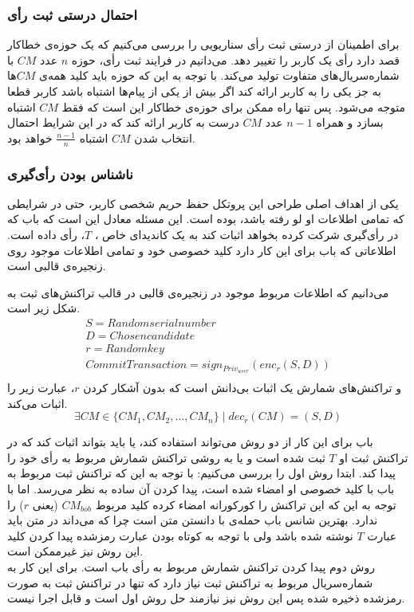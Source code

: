 \subsubsection{احتمال درستی ثبت رأی}
برای اطمینان از درستی ثبت رأی سناریویی را بررسی می‌کنیم که یک حوزه‌ی خطاکار قصد دارد رأی یک کاربر را تغییر دهد. می‌دانیم در فرایند ثبت رأی، حوزه $n$ عدد $CM$ با شماره‌سریال‌های متفاوت تولید می‌کند. با توجه‌ به این که حوزه باید کلید همه‌ی $CM$ها به جز یکی را به کاربر ارائه کند اگر بیش از یکی از پیام‌ها اشتباه باشد کاربر قطعا متوجه می‌شود. پس تنها راه ممکن برای حوزه‌ی خطاکار این است که فقط $CM$ اشتباه بسازد و همراه $n-1$ عدد $CM$ درست به کاربر ارائه کند که در این شرایط احتمال انتخاب شدن $CM$ اشتباه $\frac{n-1}{n}$ خواهد بود. 
\subsubsection{ناشناس بودن رأی‌گیری}
یکی از اهداف اصلی طراحی این پروتکل حفظ حریم شخصی کاربر، حتی در شرایطی که تمامی اطلاعات او لو رفته باشد، بوده است. این مسئله معادل این است که باب که در رأی‌گیری شرکت کرده بخواهد اثبات کند به یک کاندیدای خاص ، $T$، رأی داده است. اطلاعاتی که باب برای این کار دارد کلید خصوصی خود و تمامی اطلاعات موجود روی زنجیره‌ی قالبی است. 
\par 
می‌دانیم که اطلاعات مربوط موجود در زنجیره‌ی قالبی در قالب تراکنش‌های ثبت به شکل زیر است.
	\begin{equation}
	\begin{matrix}


S = Random serial number\\
D = Chosen candidate\\
r = Random key\\
CommitTransaction = sign_{Priv_{user}} (enc_r(S,D)) \\

	\end{matrix}
\label{eq:commit}
\end{equation}
 و تراکنش‌های شمارش یک اثبات بی‌دانش است که بدون آشکار کردن $r$، عبارت زیر را اثبات می‌کند.
	\begin{equation}
\exists CM \in \{CM_1, CM_2, ..., CM_n\}  \mid dec_r(CM) = (S,D)
\label{eq:a}
\end{equation}


\par 
باب برای این کار از دو روش می‌تواند استفاده کند، یا باید بتواند اثبات کند که در تراکنش ثبت او $T$ ثبت شده است و یا به روشی تراکنش شمارش مربوط به رأی خود را پیدا کند. ابتدا روش اول را بررسی می‌کنیم: با توجه به این که تراکنش ثبت مربوط به باب با کلید خصوصی او امضاء شده است، پیدا کردن آن ساده به نظر می‌رسد. اما با توجه به این که این تراکنش را کورکورانه امضاء کرده کلید مربوط $CM_{bob}$ (یعنی $r$) را ندارد. بهترین شانس باب حمله‌ی با دانستن متن
 است چرا که می‌داند در متن باید عبارت $T$ نوشته شده باشد ولی با توجه به کوتاه بودن عبارت رمزشده پیدا کردن کلید این روش نیز غیرممکن است. 
 \\
 روش دوم پیدا کردن تراکنش شمارش مربوط به رأی باب است. برای این کار به شماره‌سریال مربوط به تراکنش ثبت نیاز دارد که تنها در تراکنش ثبت به صورت رمزشده ذخیره شده پس این روش نیز نیازمند حل روش اول است و قابل اجرا نیست. 
